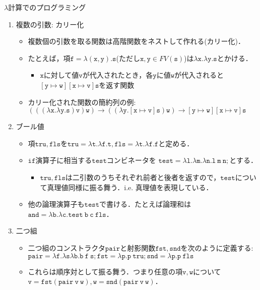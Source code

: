 \documentclass[9pt]{beamer}
\begin{document}
\begin{frame}{$\lambda$計算でのプログラミング}
\begin{enumerate}
	\item 複数の引数: カリー化\begin{itemize}
		\item 複数個の引数を取る関数は高階関数をネストして作れる(カリー化)．
		\item たとえば，項$\mathtt{f = \lambda \left(x, y\right).s}$(ただし$\mathtt{x,y}\in FV(\mathtt{s})$)は$\mathtt{\lambda x. \lambda y. s}$とかける．
		\begin{itemize}
			\item $\mathtt{x}$に対して値$\mathtt{v}$が代入されたとき，各$\mathtt{y}$に値$\mathtt{w}$が代入されると$\mathtt{\left[y\mapsto w\right]\left[x \mapsto v\right]s}$を返す関数
		\end{itemize}
		\item カリー化された関数の簡約列の例: $\mathtt{(((\lambda x. \lambda y.  s) v) w) \longrightarrow((\lambda y. \left[x \mapsto v\right] s)w)\longrightarrow \left[y \mapsto w\right]\left[x \mapsto v\right]s}$
	\end{itemize}
	\item ブール値\begin{itemize}
	\item 項$\mathtt{tru, fls}$を$\mathtt{tru = \lambda t. \lambda f. t, fls = \lambda t.\lambda f. f}$と定める． 
		\item $\mathtt{if}$演算子に相当する$\mathtt{test}$コンビネータを $\mathtt{test = \lambda l. \lambda m. \lambda n. l\ m\ n;}$とする．\begin{itemize}
		\item $\mathtt{tru, fls}$は二引数のうちそれぞれ前者と後者を返すので，$\mathtt{test}$について真理値同様に振る舞う．i.e. 真理値を表現している．
		\end{itemize}
		\item 他の論理演算子も$\mathtt{test}$で書ける．たとえば論理和は$\mathtt{and = \lambda b. \lambda c. test\ b\ c\ fls}$．
	\end{itemize}
	\item 二つ組\begin{itemize}
		\item 二つ組のコンストラクタ$\mathtt{pair}$と射影関数$\mathtt{fst, snd}$を次のように定義する:$\mathtt{pair = \lambda f. \lambda s \lambda b. b\ f\ s; fst = \lambda p. p\ tru; snd = \lambda p. p\ fls}$
		\item これらは順序対として振る舞う．つまり任意の項$\mathtt{v, w}$について$\mathtt{v = fst(pair\ v\ w),w =  snd(pair\ v\ w)}$．
	\end{itemize}
\end{enumerate}
\end{frame}
\end{document}
